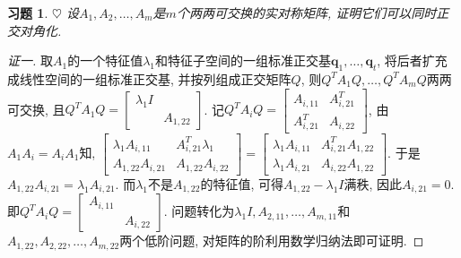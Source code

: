 \documentclass{ctexart}
\newtheorem{exercise}[thm]{习题}
\newcommand\bs[1]{\boldsymbol{ #1}}
\def\hard{$\heartsuit$}
\begin{document}
\begin{exercise} \hard
设$A_1, A_2, \dots, A_m$是$m$个两两可交换的实对称矩阵, 证明它们可以同时正交对角化. 
\end{exercise}
\begin{proof}[证一]
	取$A_1$的一个特征值$\lambda_1$和特征子空间的一组标准正交基$\bs q_1,\dots,\bs q_t$, 将后者扩充成线性空间的一组标准正交基, 并按列组成正交矩阵$Q$, 则$Q^TA_1Q,\dots,Q^TA_mQ$两两可交换, 且$Q^TA_1Q=\begin{bmatrix}
		\lambda_1I & \\ &  A_{1,22}
	\end{bmatrix}$. 记$Q^TA_iQ=\begin{bmatrix}
	A_{i,11} & A_{i,21}^T \\ A_{i,21}^T & A_{i,22}
	\end{bmatrix}$, 由$A_1A_i=A_iA_1$知, $\begin{bmatrix}
	\lambda_1A_{i,11} & A_{i,21}^T\lambda_1 \\  A_{1,22}A_{i,21} &  A_{1,22}A_{i,22}
	\end{bmatrix}=\begin{bmatrix}
	\lambda_1A_{i,11} & A_{i,21}^T A_{1,22} \\ \lambda_1A_{i,21} & A_{i,22} A_{1,22}
	\end{bmatrix}$. 
	于是$ A_{1,22}A_{i,21}=\lambda_1A_{i,21}$. 
	而$\lambda_1$不是$ A_{1,22}$的特征值, 可得$ A_{1,22}-\lambda_1I$满秩, 因此$A_{i,21}=0$. 
	即$Q^TA_iQ=\begin{bmatrix}
	A_{i,11} &  \\  & A_{i,22}
	\end{bmatrix}$. 
	问题转化为$\lambda_1I, A_{2,11},\dots,A_{m,11}$和$ A_{1,22},A_{2,22},\dots,A_{m,22}$两个低阶问题, 对矩阵的阶利用数学归纳法即可证明. 
\end{proof}
\end{document}
